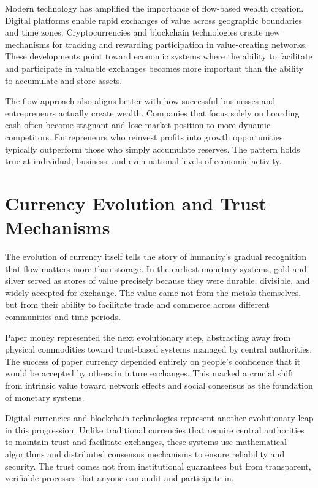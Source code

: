 \documentclass[
  Letterpaper,
]{scrbook}
\begin{document}
Modern technology has amplified the importance of flow-based wealth
creation. Digital platforms enable rapid exchanges of value across
geographic boundaries and time zones. Cryptocurrencies and blockchain
technologies create new mechanisms for tracking and rewarding
participation in value-creating networks. These developments point
toward economic systems where the ability to facilitate and participate
in valuable exchanges becomes more important than the ability to
accumulate and store assets.

The flow approach also aligns better with how successful businesses and
entrepreneurs actually create wealth. Companies that focus solely on
hoarding cash often become stagnant and lose market position to more
dynamic competitors. Entrepreneurs who reinvest profits into growth
opportunities typically outperform those who simply accumulate reserves.
The pattern holds true at individual, business, and even national levels
of economic activity.

\section{Currency Evolution and Trust
Mechanisms}\label{currency-evolution-and-trust-mechanisms}

The evolution of currency itself tells the story of humanity's gradual
recognition that flow matters more than storage. In the earliest
monetary systems, gold and silver served as stores of value precisely
because they were durable, divisible, and widely accepted for exchange.
The value came not from the metals themselves, but from their ability to
facilitate trade and commerce across different communities and time
periods.

Paper money represented the next evolutionary step, abstracting away
from physical commodities toward trust-based systems managed by central
authorities. The success of paper currency depended entirely on people's
confidence that it would be accepted by others in future exchanges. This
marked a crucial shift from intrinsic value toward network effects and
social consensus as the foundation of monetary systems.

Digital currencies and blockchain technologies represent another
evolutionary leap in this progression. Unlike traditional currencies
that require central authorities to maintain trust and facilitate
exchanges, these systems use mathematical algorithms and distributed
consensus mechanisms to ensure reliability and security. The trust comes
not from institutional guarantees but from transparent, verifiable
processes that anyone can audit and participate in.
\end{document}
